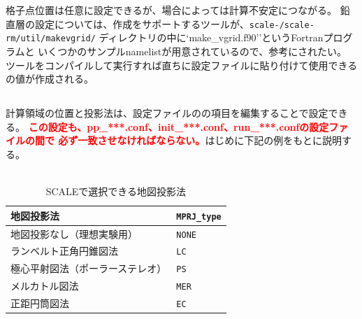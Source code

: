 格子点位置は任意に設定できるが、場合によっては計算不安定につながる。
鉛直層の設定については、作成をサポートするツールが、\texttt{scale-\version/scale-rm/util/makevgrid/}
ディレクトリの中に`make\_vgrid.f90''というFortranプログラムと
いくつかのサンプルnamelistが用意されているので、参考にされたい。
ツールをコンパイルして実行すれば直ちに設定ファイルに貼り付けて使用できる
の値が作成される。

\subsection{\SecAdvanceMapprojectionSetting} \label{subsec:adv_mapproj}
計算領域の位置と投影法は、設定ファイルのの項目を編集することで設定できる。
\textcolor{red}{\bf この設定も、pp\_***.conf、init\_***.conf、run\_***.confの設定ファイルの間で
必ず一致させなければならない。}はじめに下記の例をもとに説明する。\\

\\

\begin{table}[b]
\begin{center}
\caption{SCALEで選択できる地図投影法}
\begin{tabularx}{150mm}{|l|X|} \hline
 \rowcolor[gray]{0.9} 地図投影法 & \verb|MPRJ_type| \\ \hline
 地図投影なし（理想実験用）& \verb|NONE| \\ \hline
 ランベルト正角円錐図法 & \verb|LC| \\ \hline
 極心平射図法（ポーラーステレオ） & \verb|PS| \\ \hline
 メルカトル図法 & \verb|MER| \\ \hline
 正距円筒図法 & \verb|EC| \\ \hline
\end{tabularx}
\label{tab:map_proj}
\end{center}
\end{table}


